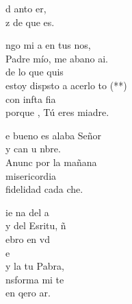 \documentclass[12pt]{article}
\begin{document}
\begin{multicols*}{2}
\begin{cancion}%
	d anto er, \\
	z de  que es. \\
\end{cancion}%

\begin{cancion}%
	ngo mi a en tus nos,\\
	Padre mío, me abano ai.\\
	 de  lo que quis\\
	estoy dispsto a acerlo to (**)\\
	con infta fia\\
	porque , Tú eres miadre. \\
\end{cancion}%

\begin{cancion}%
	e bueno es alaba Señor\\
	y can u nbre.\\
	Anunc por la mañana \\
	 misericordia\\
	fidelidad cada che.\\
\end{cancion}%

\begin{cancion}%
	ie na del a\\
	y del Esritu, ñ \\
	ebro en vd\\
	e \\
	y la   tu Pabra,\\
	nsforma mi te\\
	en qero ar.  \\
\end{cancion}%


\end{multicols*}
\end{document}
